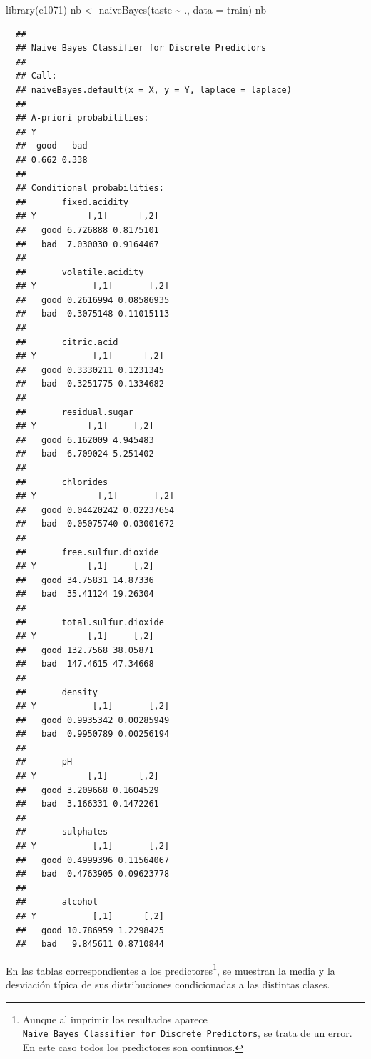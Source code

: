 \documentclass[
]{book}
\newenvironment{Shaded}{\begin{snugshade}}{\end{snugshade}}
\newcommand{\AttributeTok}[1]{\textcolor[rgb]{0.77,0.63,0.00}{#1}}
\newcommand{\FunctionTok}[1]{\textcolor[rgb]{0.00,0.00,0.00}{#1}}
\newcommand{\NormalTok}[1]{#1}
\newcommand{\OtherTok}[1]{\textcolor[rgb]{0.56,0.35,0.01}{#1}}
\newcommand{\SpecialCharTok}[1]{\textcolor[rgb]{0.00,0.00,0.00}{#1}}
\theoremstyle{break}
\theoremstyle{nonumberplain}
\begin{document}
\begin{Shaded}
\begin{Highlighting}[]
\FunctionTok{library}\NormalTok{(e1071)}
\NormalTok{nb }\OtherTok{\textless{}{-}} \FunctionTok{naiveBayes}\NormalTok{(taste }\SpecialCharTok{\textasciitilde{}}\NormalTok{ ., }\AttributeTok{data =}\NormalTok{ train)}
\NormalTok{nb}
\end{Highlighting}
\end{Shaded}

\begin{verbatim}
  ## 
  ## Naive Bayes Classifier for Discrete Predictors
  ## 
  ## Call:
  ## naiveBayes.default(x = X, y = Y, laplace = laplace)
  ## 
  ## A-priori probabilities:
  ## Y
  ##  good   bad 
  ## 0.662 0.338 
  ## 
  ## Conditional probabilities:
  ##       fixed.acidity
  ## Y          [,1]      [,2]
  ##   good 6.726888 0.8175101
  ##   bad  7.030030 0.9164467
  ## 
  ##       volatile.acidity
  ## Y           [,1]       [,2]
  ##   good 0.2616994 0.08586935
  ##   bad  0.3075148 0.11015113
  ## 
  ##       citric.acid
  ## Y           [,1]      [,2]
  ##   good 0.3330211 0.1231345
  ##   bad  0.3251775 0.1334682
  ## 
  ##       residual.sugar
  ## Y          [,1]     [,2]
  ##   good 6.162009 4.945483
  ##   bad  6.709024 5.251402
  ## 
  ##       chlorides
  ## Y            [,1]       [,2]
  ##   good 0.04420242 0.02237654
  ##   bad  0.05075740 0.03001672
  ## 
  ##       free.sulfur.dioxide
  ## Y          [,1]     [,2]
  ##   good 34.75831 14.87336
  ##   bad  35.41124 19.26304
  ## 
  ##       total.sulfur.dioxide
  ## Y          [,1]     [,2]
  ##   good 132.7568 38.05871
  ##   bad  147.4615 47.34668
  ## 
  ##       density
  ## Y           [,1]       [,2]
  ##   good 0.9935342 0.00285949
  ##   bad  0.9950789 0.00256194
  ## 
  ##       pH
  ## Y          [,1]      [,2]
  ##   good 3.209668 0.1604529
  ##   bad  3.166331 0.1472261
  ## 
  ##       sulphates
  ## Y           [,1]       [,2]
  ##   good 0.4999396 0.11564067
  ##   bad  0.4763905 0.09623778
  ## 
  ##       alcohol
  ## Y           [,1]      [,2]
  ##   good 10.786959 1.2298425
  ##   bad   9.845611 0.8710844
\end{verbatim}

En las tablas correspondientes a los predictores\footnote{Aunque al imprimir los resultados aparece \texttt{Naive\ Bayes\ Classifier\ for\ Discrete\ Predictors}, se trata de un error. En este caso todos los predictores son continuos.}, se muestran la media y la desviación típica de sus distribuciones condicionadas a las distintas clases.
\end{document}
